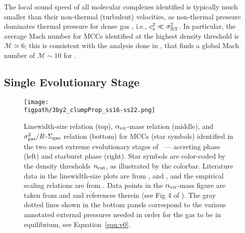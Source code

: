 \IfFileExists{emulateapjlegacy.cls}{\documentclass[iop]{emulateapjlegacy}}{\documentclass[iop]{emulateapj}}
\def\figpath{./Fig}
\begin{document}
The local sound speed of all molecular complexes identified is typically much smaller than their non-thermal (turbulent) velocities,
as non-thermal pressure dominates thermal pressure for dense gas \citep{Pallottini17b}, i.e., $c_s^2 \ll \sigma_{\rm NT}^2$. In particular, the average Mach number for MCCs identified at the highest density threshold is $\mathcal{M} \simeq6$; this is consistent with the analysis done in \citep{Vallini18a}, that finds a global Mach number of $\mathcal{M} \sim 10$ for \flower.

\subsection{Single Evolutionary Stage}  \label{sec:singless}

\begin{figure*}
\centering
\texttt{[image: \\figpath/3by2\_clumpProp\_ss16-ss22.png]}
\caption{
Linewidth-size relation (top), $\alpha_{\rm vir}$-mass relation
(middle), and $\sigma_{\rm gas}^2/R$-$\Sigma_{\rm gas}$ relation (bottom) for
MCCs (star symbols) identified in the two most extreme evolutionary
stages of \flower\ --- accreting phase (left) and starburst phase
(right). Star symbols are color-coded by the density thresholds
$n_{\rm cut}$, as illustrated by the colorbar.
Literature data in the linewidth-size plots are from \citet{Heyer04a, Rosolowsky05a, Bolatto08a,
Leroy15a}, and \citet{Swinbank11a}, and the empirical scaling relations are
from \citet{Larson81a, Heyer04a, Bolatto08a}.
Data points in the $\alpha_{\rm vir}$-mass figure are taken from
\citet{Kauffmann17a} and \citet{Kauffmann17b} and references therein
(see Fig 4 of \citealt{Kauffmann17b}).
The gray dotted lines shown in the bottom panels correspond to the various annotated external pressures needed in order for
the gas to be in equilibrium, see Equation~\ref{eqn:v0}.
\label{fig:larsons_single}}
\end{figure*}
\end{document}
